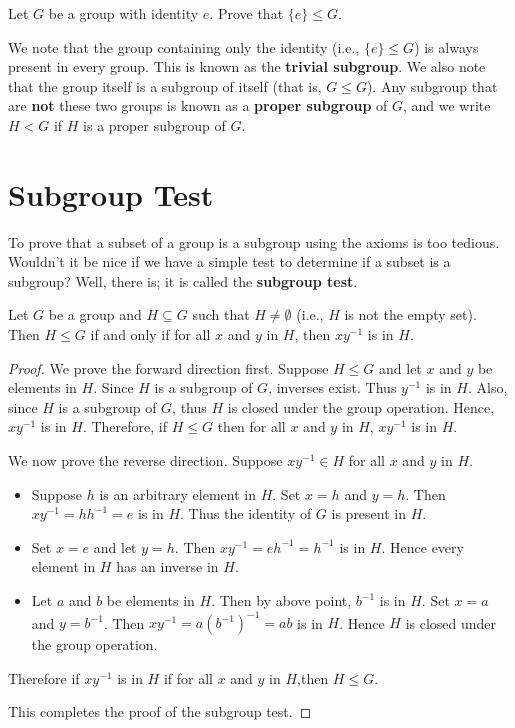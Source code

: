 \begin{exercise}
    Let $G$ be a group with identity $e$. Prove that $\{e\} \leq G$.
\end{exercise}

We note that the group containing only the identity (i.e., $\{e\} \leq G$) is always present in every group. This is known as the \textbf{trivial subgroup}. We also note that the group itself is a subgroup of itself (that is, $G \leq G$). Any subgroup that are \textbf{not} these two groups is known as a \textbf{proper subgroup} of $G$, and we write $H < G$ if $H$ is a proper subgroup of $G$.

\section{Subgroup Test}
To prove that a subset of a group is a subgroup using the axioms is too tedious. Wouldn't it be nice if we have a simple test to determine if a subset is a subgroup? Well, there is; it is called the \textbf{subgroup test}.
\begin{theorem}
    Let $G$ be a group and $H \subseteq G$ such that $H \neq \emptyset$ (i.e., $H$ is not the empty set). Then $H \leq G$ if and only if for all $x$ and $y$ in $H$, then $xy^{-1}$ is in $H$.
\end{theorem}
\begin{proof}
    We prove the forward direction first. Suppose $H \leq G$ and let $x$ and $y$ be elements in $H$. Since $H$ is a subgroup of $G$, inverses exist. Thus $y^{-1}$ is in $H$. Also, since $H$ is a subgroup of $G$, thus $H$ is closed under the group operation. Hence, $xy^{-1}$ is in $H$. Therefore, if $H \leq G$ then for all $x$ and $y$ in $H$, $xy^{-1}$ is in $H$.

    We now prove the reverse direction. Suppose $xy^{-1}\in H$ for all $x$ and $y$ in $H$.
    \begin{itemize}
        \item Suppose $h$ is an arbitrary element in $H$. Set $x = h$ and $y = h$. Then $xy^{-1} = hh^{-1} = e$ is in $H$. Thus the identity of $G$ is present in $H$.
        \item Set $x = e$ and let $y = h$. Then $xy^{-1} = eh^{-1} = h^{-1}$ is in $H$. Hence every element in $H$ has an inverse in $H$.
        \item Let $a$ and $b$ be elements in $H$. Then by above point, $b^{-1}$ is in $H$. Set $x = a$ and $y = b^{-1}$. Then $xy^{-1} = a\left(b^{-1}\right)^{-1} = ab$ is in $H$. Hence $H$ is closed under the group operation.
    \end{itemize}
    Therefore if $xy^{-1}$ is in $H$ if for all $x$ and $y$ in $H$,then $H \leq G$.

    This completes the proof of the subgroup test.
\end{proof}

